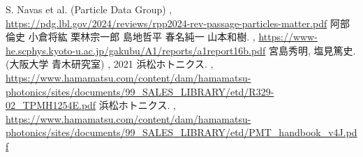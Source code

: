 \documentclass[../../main.tex]{subfiles}
\numberwithin{equation}{section}
\numberwithin{table}{section}
\numberwithin{figure}{section}
\begin{document}
  \begin{thebibliography}{99}
      S. Navas et al. (Particle Data Group)
      \newblock , \url{https://pdg.lbl.gov/2024/reviews/rpp2024-rev-passage-particles-matter.pdf}
      阿部倫史 小倉将紘 栗林宗一郎  島地哲平 春名純一 山本和樹.
      \newblock , \url{https://www-he.scphys.kyoto-u.ac.jp/gakubu/A1/reports/a1report16b.pdf}
      宮島秀明, 塩見篤史. (大阪大学 青木研究室)
      \newblock , 2021
      浜松ホトニクス.
      \newblock , \url{https://www.hamamatsu.com/content/dam/hamamatsu-photonics/sites/documents/99_SALES_LIBRARY/etd/R329-02_TPMH1254E.pdf}
      浜松ホトニクス.
      \newblock , \url{https://www.hamamatsu.com/content/dam/hamamatsu-photonics/sites/documents/99_SALES_LIBRARY/etd/PMT_handbook_v4J.pdf}
  \end{thebibliography}
\end{document}
